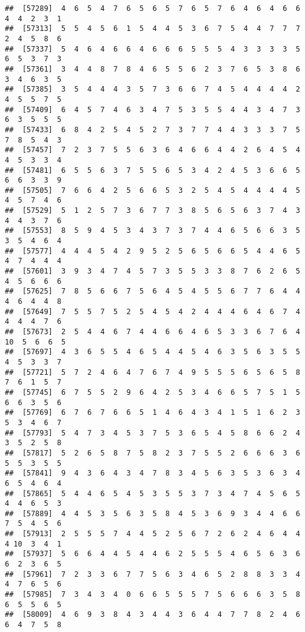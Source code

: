 \documentclass[
]{book}
\begin{document}
\begin{verbatim}
##  [57289]  4  6  5  4  7  6  5  6  5  7  6  5  7  6  4  6  4  6  6  4  4  2  3  1
##  [57313]  5  5  4  5  6  1  5  4  4  5  3  6  7  5  4  4  7  7  7  2  4  5  8  6
##  [57337]  5  4  6  4  6  6  4  6  6  6  5  5  5  4  3  3  3  3  5  6  5  3  7  3
##  [57361]  3  4  4  8  7  8  4  6  5  5  6  2  3  7  6  5  3  8  6  3  4  6  3  5
##  [57385]  3  5  4  4  4  3  5  7  3  6  6  7  4  5  4  4  4  4  2  4  5  5  7  5
##  [57409]  6  4  5  7  4  6  3  4  7  5  3  5  5  4  4  3  4  7  3  6  3  5  5  5
##  [57433]  6  8  4  2  5  4  5  2  7  3  7  7  4  4  3  3  3  7  5  7  8  5  4  3
##  [57457]  7  2  3  7  5  5  6  3  6  4  6  6  4  4  2  6  4  5  4  4  5  3  3  4
##  [57481]  6  5  5  6  3  7  5  5  6  5  3  4  2  4  5  3  6  6  5  6  6  3  3  9
##  [57505]  7  6  6  4  2  5  6  6  5  3  2  5  4  5  4  4  4  4  5  4  5  7  4  6
##  [57529]  5  1  2  5  7  3  6  7  7  3  8  5  6  5  6  3  7  4  3  4  4  3  7  6
##  [57553]  8  5  9  4  5  3  4  3  7  3  7  4  4  6  5  6  6  3  5  3  5  4  6  4
##  [57577]  4  4  4  5  4  2  9  5  2  5  6  5  6  6  5  4  4  6  5  4  7  4  4  4
##  [57601]  3  9  3  4  7  4  5  7  3  5  5  3  3  8  7  6  2  6  5  4  5  6  6  6
##  [57625]  7  8  5  6  6  7  5  6  4  5  4  5  5  6  7  7  6  4  4  4  6  4  4  8
##  [57649]  7  5  5  7  5  2  5  4  5  4  2  4  4  4  6  4  6  7  4  4  4  4  7  6
##  [57673]  2  5  4  4  6  7  4  4  6  6  4  6  5  3  3  6  7  6  4 10  5  6  6  5
##  [57697]  4  3  6  5  5  4  6  5  4  4  5  4  6  3  5  6  3  5  5  4  5  3  3  7
##  [57721]  5  7  2  4  6  4  7  6  7  4  9  5  5  5  6  5  6  5  8  7  6  1  5  7
##  [57745]  6  7  5  5  2  9  6  4  2  5  3  4  6  6  5  7  5  1  5  6  6  3  5  6
##  [57769]  6  7  6  7  6  6  5  1  4  6  4  3  4  1  5  1  6  2  3  5  3  4  6  7
##  [57793]  5  4  7  3  4  5  3  7  5  3  6  5  4  5  8  6  6  2  4  3  5  2  5  8
##  [57817]  5  2  6  5  8  7  5  8  2  3  7  5  5  2  6  6  6  3  6  5  5  3  5  5
##  [57841]  9  4  3  6  4  3  4  7  8  3  4  5  6  3  5  3  6  3  4  6  5  4  6  4
##  [57865]  5  4  4  6  5  4  5  3  5  5  3  7  3  4  7  4  5  6  5  4  4  6  5  3
##  [57889]  4  4  5  3  5  6  3  5  8  4  5  3  6  9  3  4  4  6  6  7  5  4  5  6
##  [57913]  2  5  5  5  7  4  4  5  2  5  6  7  2  6  2  4  6  4  4  4 10  3  4  1
##  [57937]  5  6  6  4  4  5  4  4  6  2  5  5  5  4  6  5  6  3  6  6  2  3  6  5
##  [57961]  7  2  3  3  6  7  7  5  6  3  4  6  5  2  8  8  3  3  4  4  7  6  5  6
##  [57985]  7  3  4  3  4  0  6  6  5  5  5  7  5  6  6  6  3  5  8  6  5  5  6  5
##  [58009]  4  6  9  3  8  4  3  4  4  3  6  4  4  7  7  8  2  4  6  6  4  7  5  8

\end{verbatim}
\end{document}
